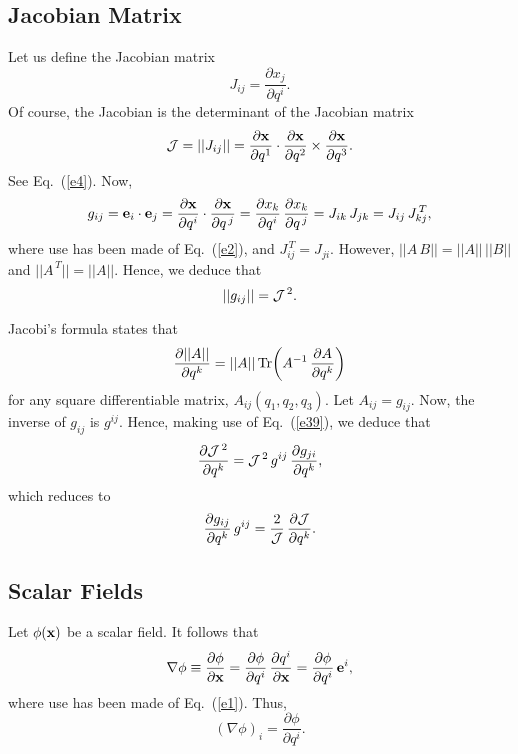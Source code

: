 \documentclass[12pt,prb,aps,notitlepage]{revtex4-1}
\begin{document}
\subsection{Jacobian Matrix}
 Let us define the Jacobian matrix
 \begin{equation}
 J_{ij} = \frac{\partial x_j}{\partial q^i}.
 \end{equation}
 Of course, the Jacobian is the determinant of the Jacobian matrix
 \begin{equation}
 {\cal J} = ||J_{ij}||= \frac{\partial{\bf x}}{\partial q^1}\cdot\frac{\partial {\bf x}}{\partial q^2}\times\frac{\partial{\bf x}}{\partial q^3}.
 \end{equation}
 See Eq.~(\ref{e4}). 
 Now,
 \begin{equation}
 g_{ij} = {\bf e}_i\cdot{\bf e}_j= \frac{\partial{\bf x}}{\partial q^i}\cdot\frac{{\partial {\bf x}}}{\partial q^{\,j}}= \frac{\partial x_k}{\partial q^i}\,\frac{{\partial x_k}}{\partial q^{\,j}}= J_{ik}\,J_{jk} = J_{ij}\,J^{\,T}_{kj},
 \end{equation}
 where use has been made of Eq.~(\ref{e2}), and $J^{\,T}_{ij}= J_{ji}$. However, $||A\,B|| = ||A||\,||B||$ and $||A^{\,T}|| = ||A||$. Hence, we deduce that
 \begin{equation}\label{e39}
 ||g_{ij}|| = {\cal J}^{\,2}.
 \end{equation}
 
 Jacobi's formula states that
 \begin{equation}
 \frac{\partial ||A||}{\partial q^k} = ||A||\,{\rm Tr}\!\left(A^{-1}\,\frac{\partial A}{\partial q^k}\right)
 \end{equation}
 for any square differentiable matrix, $A_{ij}(q_1,q_2,q_3)$. 
 Let $A_{ij}= g_{ij}$. Now, the inverse of $g_{ij}$ is $g^{ij}$. Hence, making use of Eq.~(\ref{e39}), we deduce that
 \begin{equation}
 \frac{\partial{\cal J}^{\,2}}{\partial q^k} = {\cal J}^{\,2}\,g^{ij}\,\frac{\partial g_{ji}}{\partial q^k},
 \end{equation}
 which reduces to
 \begin{equation}\label{e42}
 \frac{\partial g_{ij}}{\partial q^k}\,g^{ij} = \frac{2}{\cal J}\,\frac{\partial{\cal J}}{\partial q^k}.
 \end{equation}
 
\subsection{Scalar Fields}
Let $\phi({\bf x})$ be a scalar field. It follows that
\begin{equation}
\nabla \phi \equiv \frac{\partial \phi}{\partial{\bf x}}  = \frac{\partial\phi}{\partial q^i}\,\frac{\partial q^i}{\partial{\bf x}}= \frac{\partial\phi}{\partial q^i}\,{\bf e}^i,
\end{equation}
where use has been made of Eq.~(\ref{e1}). Thus,
\begin{equation}
(\nabla\phi)_i = \frac{\partial\phi}{\partial q^i}.
\end{equation}
\end{document}
